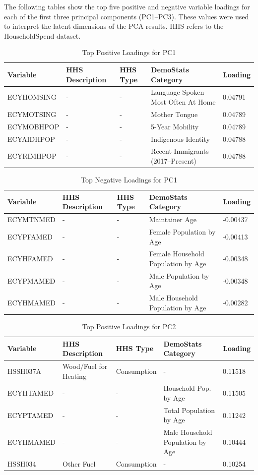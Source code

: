 \documentclass{article}
\begin{document}
The following tables show the top five positive and negative variable loadings for each of the first three principal components (PC1–PC3). These values were used to interpret the latent dimensions of the PCA results. HHS refers to the HouseholdSpend dataset.

\begin{table}[H]
\centering
\caption{Top Positive Loadings for PC1}
\label{tab:pc1_pos}
\begin{tabular}{@{}lllll@{}}
\toprule
Variable & HHS Description & HHS Type & DemoStats Category & Loading \\
\midrule
ECYHOMSING & - & - & Language Spoken Most Often At Home & 0.04791 \\
ECYMOTSING & - & - & Mother Tongue & 0.04789 \\
ECYMOBHPOP & - & - & 5-Year Mobility & 0.04789 \\
ECYAIDHPOP & - & - & Indigenous Identity & 0.04788 \\
ECYRIMHPOP & - & - & Recent Immigrants (2017–Present) & 0.04788 \\
\bottomrule
\end{tabular}
\end{table}

\begin{table}[H]
\centering
\caption{Top Negative Loadings for PC1}
\label{tab:pc1_neg}
\begin{tabular}{@{}lllll@{}}
\toprule
Variable & HHS Description & HHS Type & DemoStats Category & Loading \\
\midrule
ECYMTNMED & - & - & Maintainer Age & -0.00437 \\
ECYPFAMED & - & - & Female Population by Age & -0.00413 \\
ECYHFAMED & - & - & Female Household Population by Age & -0.00348 \\
ECYPMAMED & - & - & Male Population by Age & -0.00348 \\
ECYHMAMED & - & - & Male Household Population by Age & -0.00282 \\
\bottomrule
\end{tabular}
\end{table}

\begin{table}[H]
\centering
\caption{Top Positive Loadings for PC2}
\label{tab:pc2_pos}
\begin{tabular}{@{}lllll@{}}
\toprule
Variable & HHS Description & HHS Type & DemoStats Category & Loading \\
\midrule
HSSH037A & Wood/Fuel for Heating & Consumption & - & 0.11518 \\
ECYHTAMED & - & - & Household Pop. by Age & 0.11505 \\
ECYPTAMED & - & - & Total Population by Age & 0.11242 \\
ECYHMAMED & - & - & Male Household Population by Age & 0.10444 \\
HSSH034 & Other Fuel & Consumption & - & 0.10254 \\
\bottomrule
\end{tabular}
\end{table}
\end{document}
